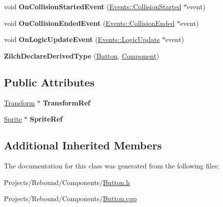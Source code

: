 \begin{DoxyCompactItemize}
\item 
\hypertarget{classDCEngine_1_1Components_1_1Button_ad28a27adf0fda22a79781859fc32eda9}{void {\bfseries On\-Collision\-Started\-Event} (\hyperlink{classDCEngine_1_1Events_1_1CollisionStarted}{Events\-::\-Collision\-Started} $\ast$event)}\label{classDCEngine_1_1Components_1_1Button_ad28a27adf0fda22a79781859fc32eda9}

\item 
\hypertarget{classDCEngine_1_1Components_1_1Button_a2c65d37f08b7ab3292b23ef300fd4eeb}{void {\bfseries On\-Collision\-Ended\-Event} (\hyperlink{classDCEngine_1_1Events_1_1CollisionEnded}{Events\-::\-Collision\-Ended} $\ast$event)}\label{classDCEngine_1_1Components_1_1Button_a2c65d37f08b7ab3292b23ef300fd4eeb}

\item 
\hypertarget{classDCEngine_1_1Components_1_1Button_a3a6d3791339f69321c6bf6cbda03fc70}{void {\bfseries On\-Logic\-Update\-Event} (\hyperlink{classDCEngine_1_1Events_1_1LogicUpdate}{Events\-::\-Logic\-Update} $\ast$event)}\label{classDCEngine_1_1Components_1_1Button_a3a6d3791339f69321c6bf6cbda03fc70}

\item 
\hypertarget{classDCEngine_1_1Components_1_1Button_a4ef28054684c02f68ddcdcf4e31ac28b}{{\bfseries Zilch\-Declare\-Derived\-Type} (\hyperlink{classDCEngine_1_1Components_1_1Button}{Button}, \hyperlink{classDCEngine_1_1Component}{Component})}\label{classDCEngine_1_1Components_1_1Button_a4ef28054684c02f68ddcdcf4e31ac28b}

\end{DoxyCompactItemize}
\subsection*{Public Attributes}
\begin{DoxyCompactItemize}
\item 
\hypertarget{classDCEngine_1_1Components_1_1Button_a58d17b4572b2bb516ded2dec0460a62e}{\hyperlink{classDCEngine_1_1Components_1_1Transform}{Transform} $\ast$ {\bfseries Transform\-Ref}}\label{classDCEngine_1_1Components_1_1Button_a58d17b4572b2bb516ded2dec0460a62e}

\item 
\hypertarget{classDCEngine_1_1Components_1_1Button_a7f4f78d9e401f04221e35caa94e59693}{\hyperlink{classDCEngine_1_1Components_1_1Sprite}{Sprite} $\ast$ {\bfseries Sprite\-Ref}}\label{classDCEngine_1_1Components_1_1Button_a7f4f78d9e401f04221e35caa94e59693}

\end{DoxyCompactItemize}
\subsection*{Additional Inherited Members}


The documentation for this class was generated from the following files\-:\begin{DoxyCompactItemize}
\item 
Projects/\-Rebound/\-Components/\hyperlink{Button_8h}{Button.\-h}\item 
Projects/\-Rebound/\-Components/\hyperlink{Button_8cpp}{Button.\-cpp}\end{DoxyCompactItemize}
